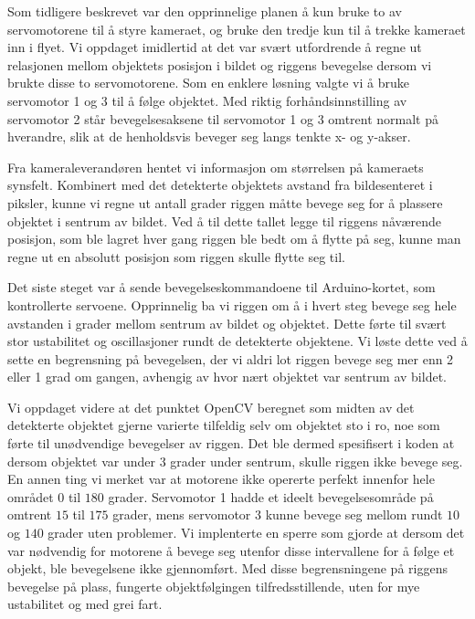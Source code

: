 Som tidligere beskrevet var den opprinnelige planen å kun bruke to av servomotorene til å styre kameraet, og bruke den tredje kun til å trekke kameraet inn i flyet. Vi oppdaget imidlertid at det var svært utfordrende å regne ut relasjonen mellom objektets posisjon i bildet og riggens bevegelse dersom vi brukte disse to servomotorene. Som en enklere løsning valgte vi å bruke servomotor 1 og 3 til å følge objektet. Med riktig forhåndsinnstilling av servomotor 2 står bevegelsesaksene til servomotor 1 og 3 omtrent normalt på hverandre, slik at de henholdsvis beveger seg langs tenkte x- og y-akser.

Fra kameraleverandøren hentet vi informasjon om størrelsen på kameraets synsfelt. Kombinert med det detekterte objektets avstand fra bildesenteret i piksler, kunne vi regne ut antall grader riggen måtte bevege seg for å plassere objektet i sentrum av bildet. Ved å til dette tallet legge til riggens nåværende posisjon, som ble lagret hver gang riggen ble bedt om å flytte på seg, kunne man regne ut en absolutt posisjon som riggen skulle flytte seg til.

Det siste steget var å sende bevegelseskommandoene til Arduino-kortet, som kontrollerte servoene. Opprinnelig ba vi riggen om å i hvert steg bevege seg hele avstanden i grader mellom sentrum av bildet og objektet. Dette førte til svært stor ustabilitet og oscillasjoner rundt de detekterte objektene. Vi løste dette ved å sette en begrensning på bevegelsen, der vi aldri lot riggen bevege seg mer enn 2 eller 1 grad om gangen, avhengig av hvor nært objektet var sentrum av bildet.

Vi oppdaget videre at det punktet OpenCV beregnet som midten av det detekterte objektet gjerne varierte tilfeldig selv om objektet sto i ro, noe som førte til unødvendige bevegelser av riggen. Det ble dermed spesifisert i koden at dersom objektet var under 3 grader under sentrum, skulle riggen ikke bevege seg. En annen ting vi merket var at motorene ikke opererte perfekt innenfor hele området $0$ til $180$ grader. Servomotor 1 hadde et ideelt bevegelsesområde på omtrent $15$ til $175$ grader, mens servomotor 3 kunne bevege seg mellom rundt $10$ og $140$ grader uten problemer. Vi implenterte en sperre som gjorde at dersom det var nødvendig for motorene å bevege seg utenfor disse intervallene for å følge et objekt, ble bevegelsene ikke gjennomført. Med disse begrensningene på riggens bevegelse på plass, fungerte objektfølgingen tilfredsstillende, uten for mye ustabilitet og med grei fart.